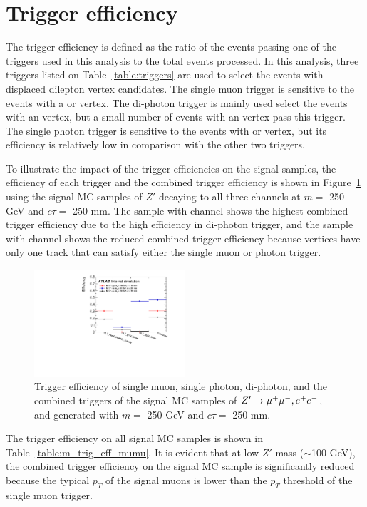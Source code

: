 \section{Trigger efficiency}
\label{sec:trigger_efficiency}
The trigger efficiency is defined as the ratio of the events passing one of the triggers used in this analysis to the total events processed. In this analysis, three triggers listed on Table~\ref{table:triggers} are used to select the events with displaced dilepton vertex candidates. The single muon trigger is sensitive to the events with a \mumu or \emu vertex. The di-photon trigger is mainly used select the events with an \ee vertex, but a small number of events with an \emu vertex pass this trigger. The single photon trigger is sensitive to the events with \ee or \emu vertex, but its efficiency is relatively low in comparison with the other two triggers.

To illustrate the impact of the trigger efficiencies on the signal samples, the efficiency of each trigger and the combined trigger efficiency is shown in Figure~\ref{fig:m_trig_eff_allchannel} using the signal MC samples of $Z'$ decaying to all three channels at $m = $ 250 GeV and $c\tau=$ 250 mm. The sample with \ee channel shows the highest combined trigger efficiency due to the high efficiency in di-photon trigger, and the sample with \emu channel shows the reduced combined trigger efficiency because \emu vertices have only one track that can satisfy either the single muon or photon trigger.

\begin{figure}[!htb]
	\includegraphics[width=0.50\textwidth]{figures/m_dv_eff_trig_allchannel.pdf}
	\centering
	\caption{Trigger efficiency of single muon, single photon, di-photon, and the combined triggers of the signal MC samples of $Z'\rightarrow\mu^{+}\mu^{-}, e^{+}e^{-}$, and \emu generated with $m=$ 250 GeV and $c\tau=$ 250 mm.}
	\label{fig:m_trig_eff_allchannel}
\end{figure}

The trigger efficiency on all \mumu signal MC samples is shown in Table~\ref{table:m_trig_eff_mumu}. It is evident that at low $Z'$ mass ($\sim$100 GeV), the combined trigger efficiency on the signal MC sample is significantly reduced because the typical $p_{T}$ of the signal muons is lower than the $p_{T}$ threshold of the single muon trigger.

